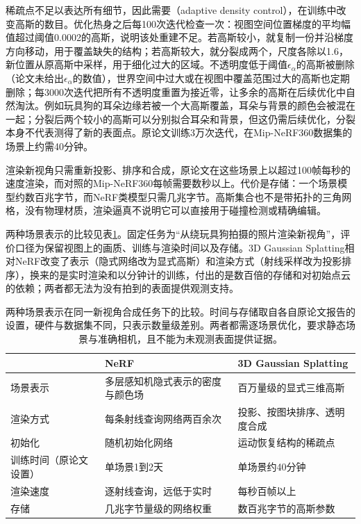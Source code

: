稀疏点不足以表达所有细节，因此需要（adaptive density control），在训练中改变高斯的数目。优化热身之后每100次迭代检查一次：视图空间位置梯度的平均幅值超过阈值0.0002的高斯，说明该处重建不足。若高斯较小，就复制一份并沿梯度方向移动，用于覆盖缺失的结构；若高斯较大，就分裂成两个，尺度各除以1.6，新位置从原高斯中采样，用于细化过大的区域。不透明度低于阈值$\epsilon_\alpha$的高斯被删除（论文未给出$\epsilon_\alpha$的数值），世界空间中过大或在视图中覆盖范围过大的高斯也定期删除；每3000次迭代把所有不透明度重置为接近零，让多余的高斯在后续优化中自然淘汰。例如玩具狗的耳朵边缘若被一个大高斯覆盖，耳朵与背景的颜色会被混在一起；分裂后两个较小的高斯可以分别拟合耳朵和背景，但这仍需后续优化，分裂本身不代表测得了新的表面点。原论文训练3万次迭代，在Mip-NeRF360数据集的场景上约需40分钟。

渲染新视角只需重新投影、排序和合成，原论文在这些场景上以超过100帧每秒的速度渲染，而对照的Mip-NeRF360每帧需要数秒以上。代价是存储：一个场景模型约数百兆字节，而NeRF类模型只需几兆字节。高斯集合也不是带拓扑的三角网格，没有物理材质，渲染逼真不说明它可以直接用于碰撞检测或精确编辑。

两种场景表示的比较见表\ref{tab:vision-generation-scene-comparison}。固定任务为“从绕玩具狗拍摄的照片渲染新视角”，评价口径为保留视图上的画质、训练与渲染时间以及存储。3D Gaussian Splatting相对NeRF改变了表示（隐式网络改为显式高斯）和渲染方式（射线采样改为投影排序），换来的是实时渲染和以分钟计的训练，付出的是数百倍的存储和对初始点云的依赖；两者都无法为没有拍到的表面提供观测支持。

\begin{table}[htbp]
 \centering
 \small
 \begin{tabularx}{\linewidth}{@{}l X X@{}}
  \toprule
   & NeRF & 3D Gaussian Splatting\\
  \midrule
  场景表示 & 多层感知机隐式表示的密度与颜色场 & 百万量级的显式三维高斯\\
  渲染方式 & 每条射线查询网络两百余次 & 投影、按图块排序、透明度合成\\
  初始化 & 随机初始化网络 & 运动恢复结构的稀疏点\\
  训练时间（原论文设置） & 单场景1到2天 & 单场景约40分钟\\
  渲染速度 & 逐射线查询，远低于实时 & 每秒百帧以上\\
  存储 & 几兆字节量级的网络权重 & 数百兆字节的高斯参数\\
  \bottomrule
 \end{tabularx}
 \caption{两种场景表示在同一新视角合成任务下的比较。时间与存储取自各自原论文报告的设置，硬件与数据集不同，只表示数量级差别。两者都需逐场景优化，要求静态场景与准确相机，且不能为未观测表面提供证据。}
 \label{tab:vision-generation-scene-comparison}
\end{table}

